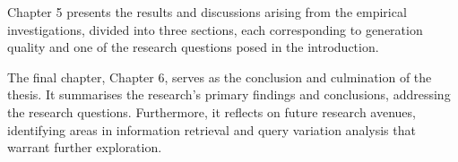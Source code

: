 Chapter 5 presents the results and discussions arising from the empirical investigations, divided into three sections, each corresponding to generation quality and one of the research questions posed in the introduction.

The final chapter, Chapter 6, serves as the conclusion and culmination of the thesis. It summarises the research's primary findings and conclusions, addressing the research questions. Furthermore, it reflects on future research avenues, identifying areas in information retrieval and query variation analysis that warrant further exploration.

